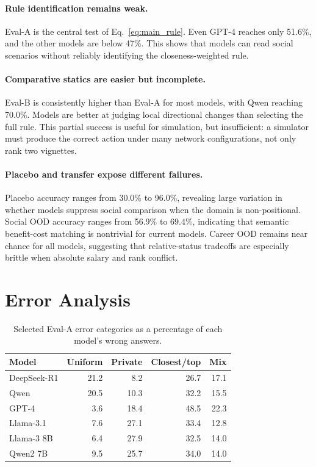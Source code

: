 \documentclass[11pt]{article}
\begin{document}
\paragraph{Rule identification remains weak.}
Eval-A is the central test of Eq.~\ref{eq:main_rule}.
Even GPT-4 reaches only 51.6\%, and the other models are below 47\%.
This shows that models can read social scenarios without reliably identifying the closeness-weighted rule.

\paragraph{Comparative statics are easier but incomplete.}
Eval-B is consistently higher than Eval-A for most models, with Qwen reaching 70.0\%.
Models are better at judging local directional changes than selecting the full rule.
This partial success is useful for simulation, but insufficient: a simulator must produce the correct action under many network configurations, not only rank two vignettes.

\paragraph{Placebo and transfer expose different failures.}
Placebo accuracy ranges from 30.0\% to 96.0\%, revealing large variation in whether models suppress social comparison when the domain is non-positional.
Social OOD accuracy ranges from 56.9\% to 69.4\%, indicating that semantic benefit-cost matching is nontrivial for current models.
Career OOD remains near chance for all models, suggesting that relative-status tradeoffs are especially brittle when absolute salary and rank conflict.

\section{Error Analysis}
\label{sec:error_analysis}

\begin{table}[t]
\centering
\small
\setlength{\tabcolsep}{3pt}
\begin{tabular}{@{}lrrrr@{}}
\toprule
\textbf{Model} & \textbf{Uniform} & \textbf{Private} & \textbf{Closest/top} & \textbf{Mix} \\
\midrule
DeepSeek-R1 & 21.2 & 8.2 & 26.7 & 17.1 \\
Qwen & 20.5 & 10.3 & 32.2 & 15.5 \\
GPT-4 & 3.6 & 18.4 & 48.5 & 22.3 \\
Llama-3.1 & 7.6 & 27.1 & 33.4 & 12.8 \\
Llama-3 8B & 6.4 & 27.9 & 32.5 & 14.0 \\
Qwen2 7B & 9.5 & 25.7 & 34.0 & 14.0 \\
\bottomrule
\end{tabular}
\caption{Selected Eval-A error categories as a percentage of each model's wrong answers.}
\label{tab:evala_errors}
\end{table}
\end{document}
